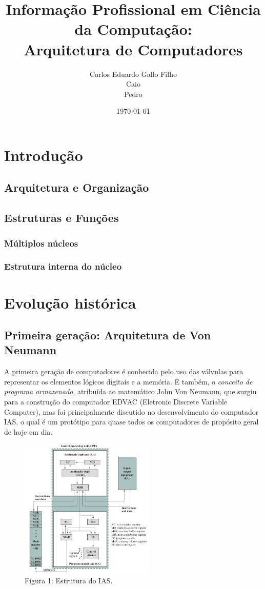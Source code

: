 \documentclass{article}
\title{Informação Profissional em Ciência da Computação:\\
	Arquitetura de Computadores}
\author{Carlos Eduardo Gallo Filho \\
	Caio \\
	Pedro}
\date{\today}
\begin{document}
\maketitle

\section{Introdução}
\subsection{Arquitetura e Organização}
\subsection{Estruturas e Funções}
\subsubsection{Múltiplos núcleos}
\subsubsection{Estrutura interna do núcleo}

\section{Evolução histórica}
\subsection{Primeira geração: Arquitetura de Von Neumann}
A primeira geração de computadores é conhecida pelo uso das válvulas para
representar os elementos lógicos digitais e a memória. E também, o
\textit{conceito de programa armazenado}, atribuída ao matemático John Von
Neumann, que surgiu para a construção do computador EDVAC (Eletronic Discrete
Variable Computer), mas foi principalmente discutido no desenvolvimento do
computador IAS, o qual é um protótipo para quase todos os computadores de
propósito geral de hoje em dia.

\begin{figure}[h]
    \caption{Figura 1: Estrutura do IAS.}
    \centering
    \includegraphics[width=0.58\textwidth]{ias.png}
\end{figure}
\end{document}
